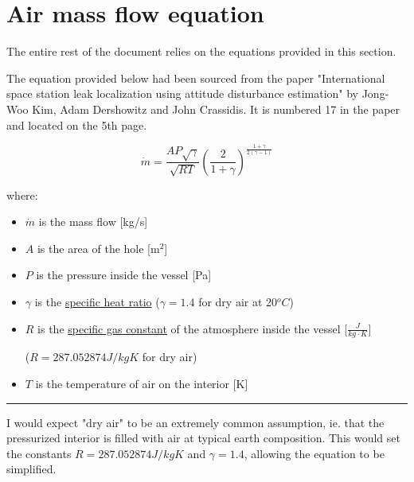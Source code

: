 \documentclass[a4paper]{article}
\begin{document}
	\vfill
	
	\tableofcontents
	
	\pagebreak
	
	\section{Air mass flow equation}
	
	The entire rest of the document relies on the equations provided in this section.
	
	\medskip
	
	The equation provided below had been sourced from the paper "International space station leak localization using attitude disturbance estimation" by Jong-Woo Kim, Adam Dershowitz and John Crassidis. It is numbered 17 in the paper and located on the 5th page.
	
	\medskip
	
	$$ \dot{m} = \frac{AP\sqrt{\gamma}}{\sqrt{RT}} \left(\frac{2}{1+\gamma}\right)^\frac{1+\gamma}{2(\gamma-1)} $$
	
	where:
	
	\begin{itemize}
		\item $\dot{m}$ is the mass flow [kg/s]
		
		\item $A$ is the area of the hole [m$^2$]
		
		\item $P$ is the pressure inside the vessel [Pa]
		
		\item $\gamma$ is the \href{https://en.wikipedia.org/wiki/Heat_capacity_ratio}{specific heat ratio} ($\gamma = 1.4$ for dry air at 20$^oC$)
		
		\item $R$ is the \href{https://en.wikipedia.org/wiki/Gas_constant#Specific_gas_constant}{specific gas constant} of the atmosphere inside the vessel [$\frac{J}{kg\cdot K}$]
		
		($R = 287.052874J/kgK$ for dry air)
		
		\item $T$ is the temperature of air on the interior [K]
	\end{itemize}
	
	\noindent\rule{\linewidth}{0.5pt}
	\medskip
	
	I would expect "dry air" to be an extremely common assumption, ie. that the pressurized interior is filled with air at typical earth composition. This would set the constants $R = 287.052874J/kgK$ and $\gamma = 1.4$, allowing the equation to be simplified.
	
\end{document}

